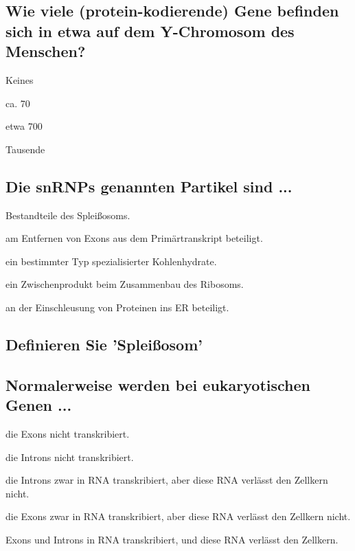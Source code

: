 \documentclass{article}
\begin{document}
\subsection*{Wie viele (protein-kodierende) Gene befinden sich in etwa auf dem Y-Chromosom des Menschen?}
\begin{todolist}%
\item Keines
\item ca. 70
\item etwa 700
\item Tausende
\end{todolist}

\subsection*{Die snRNPs genannten Partikel sind ...}
\begin{todolist}%
\item Bestandteile des Spleißosoms. 
\item am Entfernen von Exons aus dem Primärtranskript beteiligt.  
\item ein bestimmter Typ spezialisierter Kohlenhydrate.  
\item ein Zwischenprodukt beim Zusammenbau des Ribosoms.  
\item an der Einschleusung von Proteinen ins ER beteiligt.  
\end{todolist}

\subsection*{Definieren Sie 'Spleißosom'}
\bigskip\bigskip\bigskip\bigskip\bigskip\bigskip
\subsection*{Normalerweise werden bei eukaryotischen Genen ...}
\begin{todolist}%
\item die Exons nicht transkribiert.  
\item die Introns nicht transkribiert.  
\item die Introns zwar in RNA transkribiert, aber diese RNA verlässt den
Zellkern nicht.  
\item die Exons zwar in RNA transkribiert, aber diese RNA verlässt den
Zellkern nicht.  
\item Exons und Introns in RNA transkribiert, und diese RNA verlässt den
Zellkern.  
\end{todolist}
\end{document}
